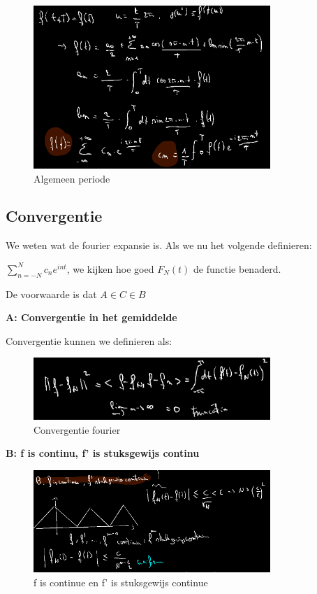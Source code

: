 \documentclass[a4paper]{report}
\begin{document}
\begin{figure}[H]
	\centering
	\includegraphics[width=0.8\textwidth]{assets/algemeen_periode_fourier.png}
	\caption{Algemeen periode}
	\label{fig:algemeen_periode_fourier}
\end{figure}

\subsection{Convergentie}

We weten wat de fourier expansie is. Als we nu het volgende definieren:

$\sum_{n=-N}^{N} c_n e^{int}$, we kijken hoe goed $F_N(t)$ de functie benaderd.

De voorwaarde is dat $A \in C \in B$

\textbf{A: Convergentie in het gemiddelde}

Convergentie kunnen we definieren als:

\begin{figure}[H]
	\centering
	\includegraphics[width=0.8\textwidth]{assets/convergentie_fourier.png}
	\caption{Convergentie fourier}
	\label{fig:convergentie_fourier}
\end{figure}

\textbf{B: f is continu, f' is stuksgewijs continu}

\begin{figure}[H]
	\centering
	\includegraphics[width=0.8\textwidth]{assets/f_is_continue_and_f_acc_is_stukgewijs_continue.png}
	\caption{f is continue en f' is stuksgewijs continue}
	\label{fig:f_is_continue_and_f_acc_is_stukgewijs_continue}
\end{figure}
\end{document}
